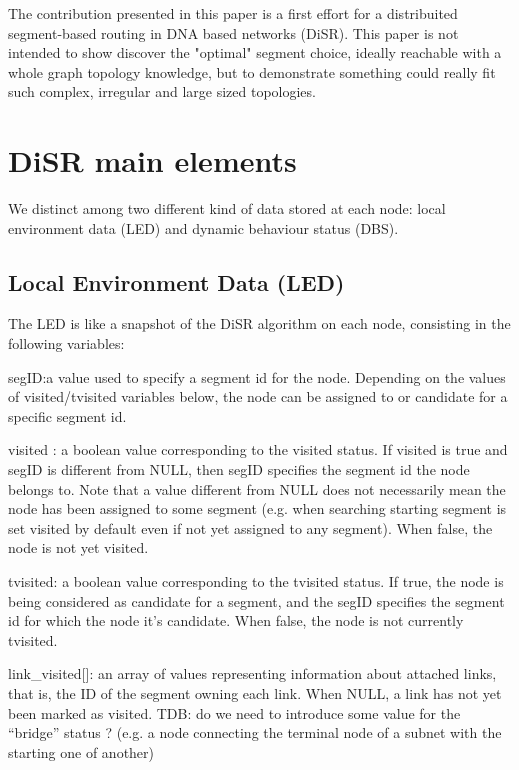 \documentclass[conference]{IEEEtran}
\begin{document}
The contribution presented in this paper is a first effort for a
distribuited segment-based routing in DNA based networks (DiSR).  This
paper is not intended to show discover the "optimal" segment choice, ideally
reachable with a whole graph topology knowledge, but to demonstrate something could
really fit such complex, irregular and large sized topologies.

\section{DiSR main elements}

We distinct among two different kind of data stored at each node:
local environment data (LED) and dynamic behaviour status (DBS).

\subsection{Local Environment Data (LED)}

The LED is like a snapshot of the DiSR algorithm on each node,
consisting in the following variables:

segID:a value used to specify a segment id for the node. Depending on
the values of visited/tvisited variables below, the node can be
assigned to or candidate for a specific segment id.  

visited : a boolean value corresponding to the visited status. If visited is true
and segID is different from NULL, then segID specifies the segment id
the node belongs to. Note that a value different from NULL does not
necessarily mean the node has been assigned to some segment (e.g. when
searching starting segment is set visited by default even if not yet
assigned to any segment). When false, the node is not yet visited.

tvisited: a boolean value corresponding to the tvisited status. If
true, the node is being considered as candidate for a segment, and the
segID specifies the segment id for which the node it's candidate. When
false, the node is not currently tvisited.  

link\_visited[]: an array
of values representing information about attached links, that is, the
ID of the segment owning each link. When NULL, a link has not yet been
marked as visited. TDB: do we need to introduce some value for the
“bridge” status ? (e.g. a node connecting the terminal node of a
subnet with the starting one of another) 
\end{document}
